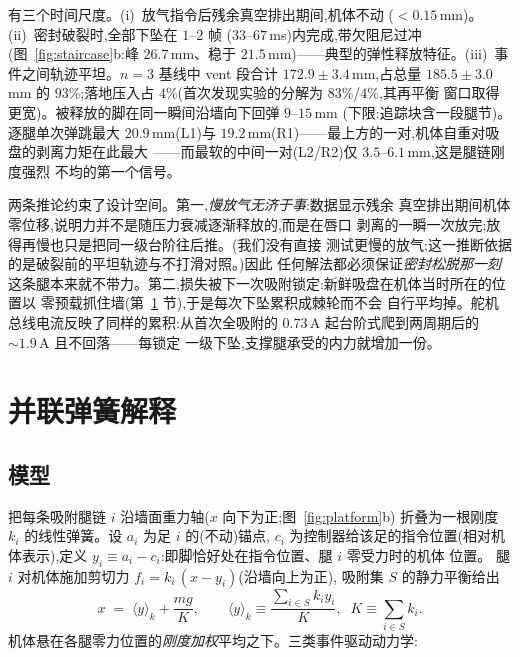 \documentclass[journal]{IEEEtran}
\begin{document}
有三个时间尺度。(i)~放气指令后残余真空排出期间,机体不动
($<0.15$\,mm)。(ii)~密封破裂时,全部下坠在 $1$--$2$ 帧
($33$--$67$\,ms)内完成,带欠阻尼过冲(图~\ref{fig:staircase}b:峰 $26.7$\,mm、稳于
$21.5$\,mm)——典型的弹性释放特征。(iii)~事件之间轨迹平坦。$n{=}3$
基线中 vent 段合计 $172.9\pm3.4$\,mm,占总量 $185.5\pm3.0$\,mm 的
$93\%$;落地压入占 $4\%$(首次发现实验的分解为 $83\%$/$4\%$,其再平衡
窗口取得更宽)。被释放的脚在同一瞬间沿墙向下回弹 $9$--$15$\,mm
(下限:追踪块含一段腿节)。逐腿单次弹跳最大 $20.9$\,mm(L1)与
$19.2$\,mm(R1)——最上方的一对,机体自重对吸盘的剥离力矩在此最大
——而最软的中间一对(L2/R2)仅 $3.5$--$6.1$\,mm,这是腿链刚度强烈
不均的第一个信号。

两条推论约束了设计空间。第一,\emph{慢放气无济于事}:数据显示残余
真空排出期间机体零位移,说明力并不是随压力衰减逐渐释放的,而是在唇口
剥离的一瞬一次放完;放得再慢也只是把同一级台阶往后推。(我们没有直接
测试更慢的放气;这一推断依据的是破裂前的平坦轨迹与不打滑对照。)因此
任何解法都必须保证\emph{密封松脱那一刻}这条腿本来就不带力。第二,损失被下一次吸附锁定:新鲜吸盘在机体当时所在的位置以
零预载抓住墙(第~\ref{sec:model} 节),于是每次下坠累积成棘轮而不会
自行平均掉。舵机总线电流反映了同样的累积:从首次全吸附的
$0.73$\,A 起台阶式爬到两周期后的 ${\sim}1.9$\,A 且不回落——每锁定
一级下坠,支撑腿承受的内力就增加一份。

\section{并联弹簧解释}
\label{sec:model}

\subsection{模型}

把每条吸附腿链 $i$ 沿墙面重力轴($x$ 向下为正;图~\ref{fig:platform}b)
折叠为一根刚度 $k_i$ 的线性弹簧。设 $a_i$ 为足 $i$ 的(不动)锚点,
$c_i$ 为控制器给该足的指令位置(相对机体表示),定义
$y_i \equiv a_i - c_i$:即脚恰好处在指令位置、腿 $i$ 零受力时的机体
位置。
腿 $i$ 对机体施加剪切力 $f_i = k_i\,(x - y_i)$(沿墙向上为正),
吸附集 $S$ 的静力平衡给出
\begin{equation}
x \;=\; \langle y\rangle_k + \frac{mg}{K},
\qquad
\langle y\rangle_k \equiv \frac{\sum_{i\in S} k_i y_i}{K},\;\;
K \equiv \sum_{i\in S} k_i .
\label{eq:equilibrium}
\end{equation}
机体悬在各腿零力位置的\emph{刚度加权}平均之下。三类事件驱动动力学:
\end{document}
